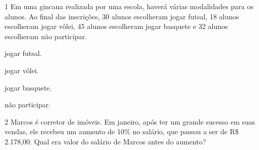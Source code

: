 \num{1} Em uma gincana realizada por uma escola, haverá várias modalidades
para os alunos. Ao final das inscrições, 30 alunos escolheram jogar
futsal, 18 alunos escolheram jogar vôlei, 45 alunos escolheram jogar
basquete e 32 alunos escolheram não participar.

\medskip


\begin{escolha}[itemsep=0pt]
\item jogar futsal.\\





\medskip

\item jogar vôlei.\\





\medskip

\item jogar basquete.\\





\medskip

\item não participar.\\




\end{escolha}


\num{2} Marcos é corretor de imóveis. Em janeiro, após ter um grande sucesso
em suas vendas, ele recebeu um aumento de 10\% no salário, que passou a
ser de R\$\,2.178,00. Qual era valor do salário de Marcos antes do aumento?

